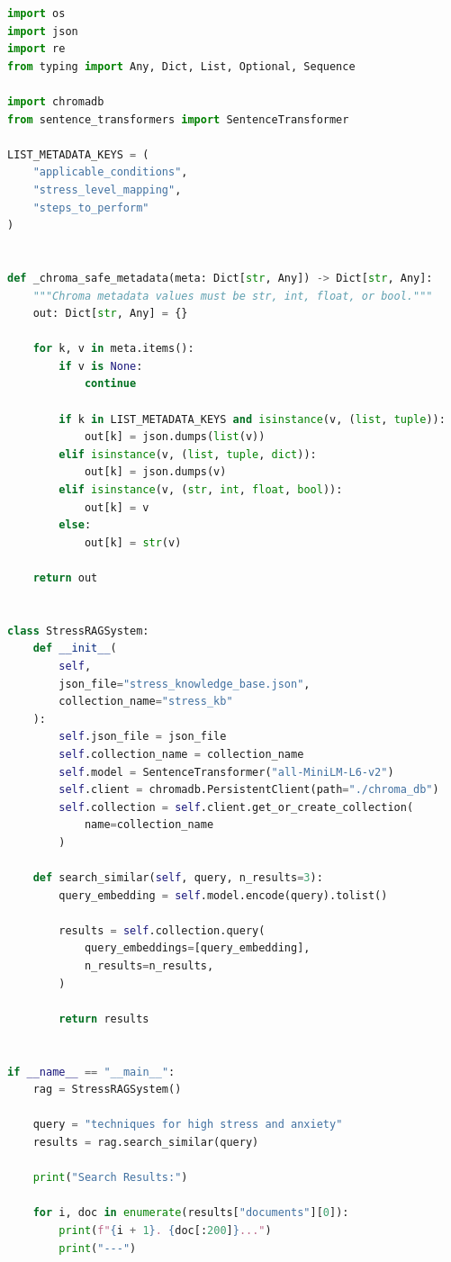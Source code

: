 \documentclass[12pt,a4paper]{report}
\begin{document}
\begin{lstlisting}[language=Python, caption={Stress RAG System Implementation}, label={code:stress-rag}]
import os
import json
import re
from typing import Any, Dict, List, Optional, Sequence

import chromadb
from sentence_transformers import SentenceTransformer

LIST_METADATA_KEYS = (
    "applicable_conditions",
    "stress_level_mapping",
    "steps_to_perform"
)


def _chroma_safe_metadata(meta: Dict[str, Any]) -> Dict[str, Any]:
    """Chroma metadata values must be str, int, float, or bool."""
    out: Dict[str, Any] = {}

    for k, v in meta.items():
        if v is None:
            continue

        if k in LIST_METADATA_KEYS and isinstance(v, (list, tuple)):
            out[k] = json.dumps(list(v))
        elif isinstance(v, (list, tuple, dict)):
            out[k] = json.dumps(v)
        elif isinstance(v, (str, int, float, bool)):
            out[k] = v
        else:
            out[k] = str(v)

    return out


class StressRAGSystem:
    def __init__(
        self,
        json_file="stress_knowledge_base.json",
        collection_name="stress_kb"
    ):
        self.json_file = json_file
        self.collection_name = collection_name
        self.model = SentenceTransformer("all-MiniLM-L6-v2")
        self.client = chromadb.PersistentClient(path="./chroma_db")
        self.collection = self.client.get_or_create_collection(
            name=collection_name
        )

    def search_similar(self, query, n_results=3):
        query_embedding = self.model.encode(query).tolist()

        results = self.collection.query(
            query_embeddings=[query_embedding],
            n_results=n_results,
        )

        return results


if __name__ == "__main__":
    rag = StressRAGSystem()

    query = "techniques for high stress and anxiety"
    results = rag.search_similar(query)

    print("Search Results:")

    for i, doc in enumerate(results["documents"][0]):
        print(f"{i + 1}. {doc[:200]}...")
        print("---")
\end{lstlisting}
\end{document}
